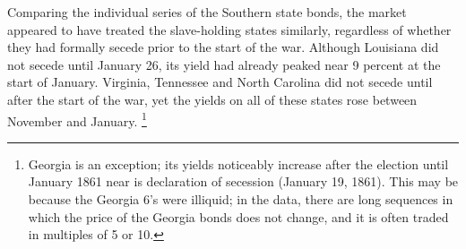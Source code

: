 Comparing the individual series of the Southern state bonds, the market appeared to have treated the slave-holding states similarly, regardless of whether they had formally secede prior to the start of the war.
Although Louisiana did not secede until January 26, its yield had already peaked near 9 percent at the start of January.
Virginia, Tennessee and North Carolina did not secede until after the start of the war, yet the yields on all of these states rose between November and January.%
\footnote{Georgia is an exception; its yields noticeably increase after the election until January 1861 near is declaration of secession (January 19, 1861).
This may be because the Georgia 6's were illiquid; in the data, there are long sequences in which the price of the Georgia bonds does not change, and it is often traded in multiples of 5 or 10.
}

